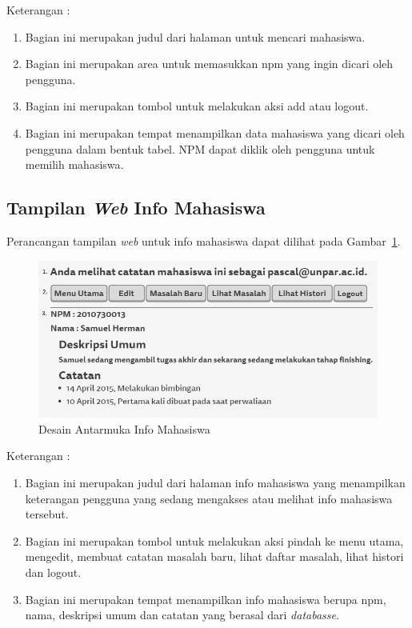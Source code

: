 Keterangan :
\begin{enumerate}[(1)]
\item
Bagian ini merupakan judul dari halaman untuk mencari mahasiswa.
\item
Bagian ini merupakan area untuk memasukkan npm yang ingin dicari oleh pengguna.
\item
Bagian ini merupakan tombol untuk melakukan aksi add atau logout.
\item
Bagian ini merupakan tempat menampilkan data mahasiswa yang dicari oleh pengguna dalam bentuk tabel. NPM dapat diklik oleh pengguna untuk memilih mahasiswa.
\end{enumerate}

\subsection{Tampilan {\it Web} Info Mahasiswa}
Perancangan tampilan {\it web} untuk info mahasiswa dapat dilihat pada Gambar~\ref{fig:infomahasiswa}.
\begin{figure}[ht]
\centering
\includegraphics[scale=0.8]{Gambar/infomahasiswa.png}
\caption[Desain Antarmuka Info Mahasiswa]{Desain Antarmuka Info Mahasiswa}
\label{fig:infomahasiswa}
\end{figure}

Keterangan :
\begin{enumerate}[(1)]
\item
Bagian ini merupakan judul dari halaman info mahasiswa yang menampilkan keterangan pengguna yang sedang mengakses atau melihat info mahasiswa tersebut.
\item
Bagian ini merupakan tombol untuk melakukan aksi pindah ke menu utama, mengedit, membuat catatan masalah baru, lihat daftar masalah, lihat histori dan logout.
\item
Bagian ini merupakan tempat menampilkan info mahasiswa berupa npm, nama, deskripsi umum dan catatan yang berasal dari {\it databasse}.
\end{enumerate}

